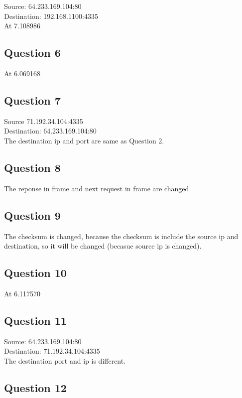 \documentclass{article}
\begin{document}
Source: 64.233.169.104:80\\
Destination: 192.168.1100:4335\\
At 7.108986 

\subsection{Question 6}

At 6.069168

\subsection{Question 7}

Source 71.192.34.104:4335\\
Destination: 64.233.169.104:80\\
The destination ip and port are same as Question 2.

\subsection{Question 8}

The reponse in frame and next request in frame are changed

\subsection{Question 9}

The checksum is changed, because the checksum is include the source ip and destination, 
so it will be changed (becasue source ip is changed).

\subsection{Question 10}

At 6.117570

\subsection{Question 11}

Source: 64.233.169.104:80\\
Destination: 71.192.34.104:4335\\
The destination port and ip is different.

\subsection{Question 12}
\end{document}
